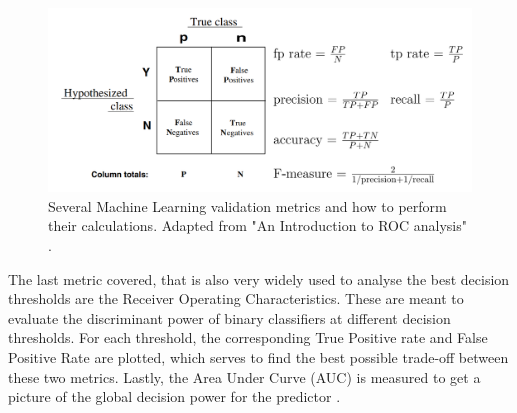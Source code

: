 \begin{figure}[h]
	\centering
	\includegraphics[width=\textwidth]{../images/results/metrics.png}
	\caption{Several Machine Learning validation metrics and how to perform their calculations. Adapted from "An Introduction to ROC analysis" \cite{fawcett2006introduction}.} 
	\label{fig:metrics}
\end{figure}

The last metric covered, that is also very widely used to analyse the best decision thresholds are the Receiver Operating Characteristics. These are meant to evaluate the discriminant power of binary classifiers at different decision thresholds. For each threshold, the corresponding True Positive rate and False Positive Rate are plotted, which serves to find the best possible trade-off between these two metrics. Lastly, the Area Under Curve (\gls{AUC}) is measured to get a picture of the global decision power for the predictor \cite{fawcett2006introduction}.